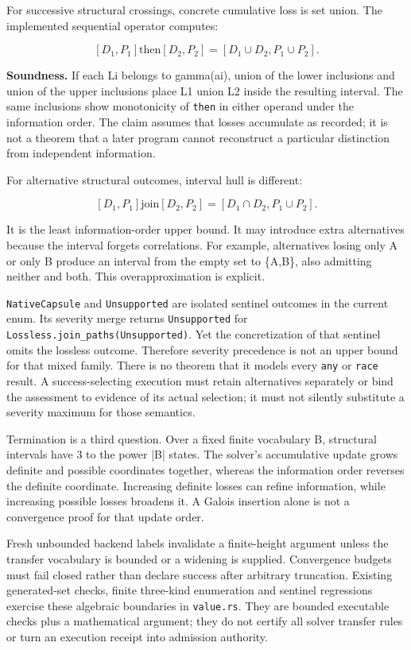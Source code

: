 \documentclass[11pt]{article}
\begin{document}
For successive structural crossings, concrete cumulative loss is set union. The implemented sequential operator computes:

\[
[D_1,P_1]\mathbin{\mathrm{then}}[D_2,P_2]
=[D_1\cup D_2,P_1\cup P_2].
\]

\textbf{Soundness.} If each Li belongs to gamma(ai), union of the lower inclusions and union of the upper inclusions place L1 union L2 inside the resulting interval. The same inclusions show monotonicity of \texttt{then} in either operand under the information order. The claim assumes that losses accumulate as recorded; it is not a theorem that a later program cannot reconstruct a particular distinction from independent information.

For alternative structural outcomes, interval hull is different:

\[
[D_1,P_1]\mathbin{\mathrm{join}}[D_2,P_2]
=[D_1\cap D_2,P_1\cup P_2].
\]

It is the least information-order upper bound. It may introduce extra alternatives because the interval forgets correlations. For example, alternatives losing only A or only B produce an interval from the empty set to \{A,B\}, also admitting neither and both. This overapproximation is explicit.

\texttt{NativeCapsule} and \texttt{Unsupported} are isolated sentinel outcomes in the current enum. Its severity merge returns \texttt{Unsupported} for \texttt{Lossless.join\_paths(Unsupported)}. Yet the concretization of that sentinel omits the lossless outcome. Therefore severity precedence is not an upper bound for that mixed family. There is no theorem that it models every \texttt{any} or \texttt{race} result. A success-selecting execution must retain alternatives separately or bind the assessment to evidence of its actual selection; it must not silently substitute a severity maximum for those semantics.

Termination is a third question. Over a fixed finite vocabulary B, structural intervals have 3 to the power |B| states. The solver's accumulative update grows definite and possible coordinates together, whereas the information order reverses the definite coordinate. Increasing definite losses can refine information, while increasing possible losses broadens it. A Galois insertion alone is not a convergence proof for that update order.

Fresh unbounded backend labels invalidate a finite-height argument unless the transfer vocabulary is bounded or a widening is supplied. Convergence budgets must fail closed rather than declare success after arbitrary truncation. Existing generated-set checks, finite three-kind enumeration and sentinel regressions exercise these algebraic boundaries in \texttt{value.rs}. They are bounded executable checks plus a mathematical argument; they do not certify all solver transfer rules or turn an execution receipt into admission authority.
\end{document}

